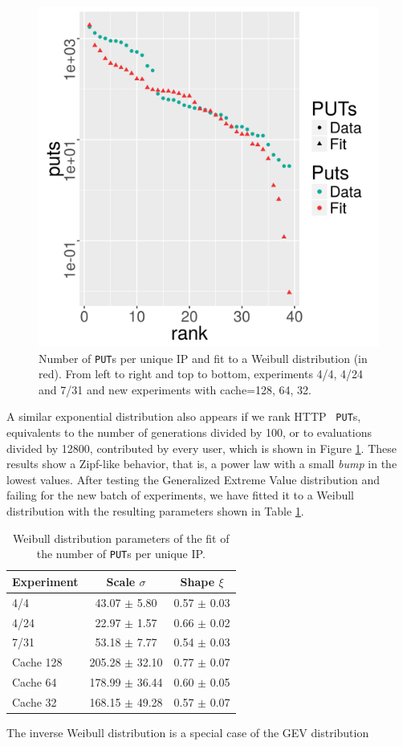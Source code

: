 \documentclass[letterpaper]{article}
\begin{document}
\begin{figure}[!htb]
\includegraphics[width=0.32\linewidth]{weibull-fit-cache=32.png}
\caption{Number of {\tt PUT}s per unique IP and fit to a Weibull
  distribution (in red). From left to right and top to bottom, experiments
  4/4, 4/24 and 7/31 and new experiments with cache=128, 64, 32.} 
\label{fig:puts:os}
\end{figure}
%
A similar exponential distribution also appears if we rank HTTP {\tt
  PUT}s, equivalents to the number of 
generations divided by 100, or to evaluations divided by 12800,
contributed by every user, which is shown 
in Figure \ref{fig:puts:os}. These results show a Zipf-like behavior,
that is, a power law with a small {\em bump} in the lowest
values. After testing the Generalized Extreme Value distribution and
failing for the new batch of experiments, we have fitted it to a
Weibull distribution \cite{thoman1969inferences} with the resulting
parameters shown in Table \ref{tab:puts:os}. 
%
\begin{table}
\caption{Weibull distribution  parameters of the fit of
  the number of {\tt PUT}s per unique IP. \label{tab:puts:os}}
\begin{center}
\begin{tabular}{l|cc}
\hline
Experiment  &  Scale $\sigma$ & Shape $\xi$ \\
\hline
4/4 &  43.07 $\pm$ 5.80 &  0.57 $\pm$ 0.03 \\
4/24 & 22.97 $\pm$ 1.57 & 0.66 $\pm$  0.02  \\
7/31 &  53.18 $\pm$ 7.77 &  0.54 $\pm$ 0.03   \\
\hline
Cache 128 & 205.28 $\pm$ 32.10 & 0.77 $\pm$ 0.07 \\ 
Cache 64 & 178.99 $\pm$ 36.44 & 0.60 $\pm$ 0.05 \\ 
Cache 32 & 168.15 $\pm$ 49.28 & 0.57 $\pm$ 0.07 \\
\hline
\end{tabular}
\end{center}
\end{table}
%
The inverse
Weibull distribution is a special case of the GEV distribution
\end{document}
